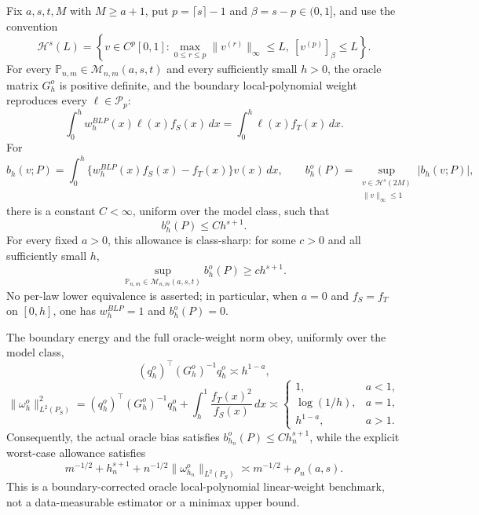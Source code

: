 Fix \(a,s,t,M\) with \(M\ge a+1\), put \(p=\lceil s\rceil-1\) and \(\beta=s-p\in(0,1]\), and use the convention
\[
\mathcal H^s(L)=\left\{v\in C^p[0,1]:
\max_{0\le r\le p}\|v^{(r)}\|_\infty\le L,
\ [v^{(p)}]_{\beta}\le L\right\}.
\]
For every \(\mathbb P_{n,m}\in\mathcal M_{n,m}(a,s,t)\) and every sufficiently small \(h>0\), the oracle matrix \(G_h^o\) is positive definite, and the boundary local-polynomial weight reproduces every \(\ell\in\mathcal P_p\):
\[
\int_0^h w_h^{BLP}(x)\ell(x)f_S(x)\,dx
=\int_0^h\ell(x)f_T(x)\,dx.
\]
For
\[
b_h(v;P)=\int_0^h\{w_h^{BLP}(x)f_S(x)-f_T(x)\}v(x)\,dx,
\qquad
b_h^o(P)=\sup_{\substack{v\in\mathcal H^s(2M)\\ \|v\|_\infty\le1}}|b_h(v;P)|,
\]
there is a constant \(C<\infty\), uniform over the model class, such that
\[
b_h^o(P)\le C h^{s+1}.
\]
For every fixed \(a>0\), this allowance is class-sharp: for some \(c>0\) and all sufficiently small \(h\),
\[
\sup_{\mathbb P_{n,m}\in\mathcal M_{n,m}(a,s,t)}b_h^o(P)\ge c h^{s+1}.
\]
No per-law lower equivalence is asserted; in particular, when \(a=0\) and \(f_S=f_T\) on \([0,h]\), one has \(w_h^{BLP}=1\) and \(b_h^o(P)=0\).

The boundary energy and the full oracle-weight norm obey, uniformly over the model class,
\[
(q_h^o)^\top(G_h^o)^{-1}q_h^o\asymp h^{1-a},
\]
\[
\|\omega_h^o\|_{L^2(P_S)}^2
=(q_h^o)^\top(G_h^o)^{-1}q_h^o
+\int_h^1\frac{f_T(x)^2}{f_S(x)}\,dx
\asymp
\begin{cases}
1,&a<1,\\
\log(1/h),&a=1,\\
h^{1-a},&a>1.
\end{cases}
\]
Consequently, the actual oracle bias satisfies \(b_{h_n}^o(P)\le C h_n^{s+1}\), while the explicit worst-case allowance satisfies
\[
m^{-1/2}+h_n^{s+1}
+n^{-1/2}\|\omega_{h_n}^o\|_{L^2(P_S)}
\asymp m^{-1/2}+\rho_n(a,s).
\]
This is a boundary-corrected oracle local-polynomial linear-weight benchmark, not a data-measurable estimator or a minimax upper bound.